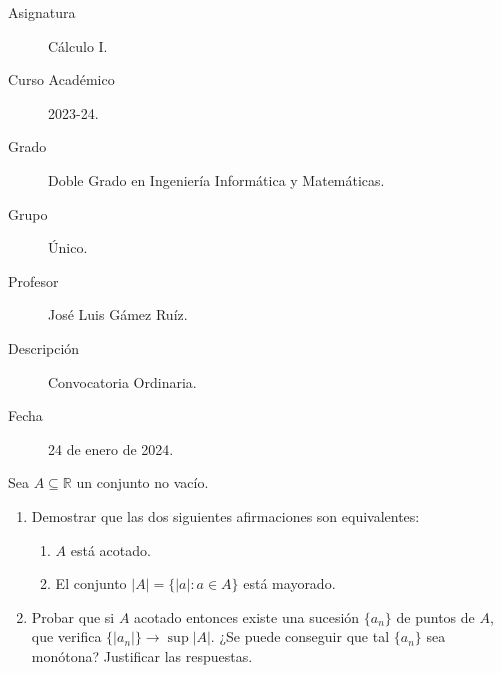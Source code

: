 \documentclass[12pt]{article}
\begin{document}

    
    

    \begin{description}
        \item[Asignatura] Cálculo I.
        \item[Curso Académico] 2023-24.
        \item[Grado] Doble Grado en Ingeniería Informática y Matemáticas.
        \item[Grupo] Único.
        \item[Profesor] José Luis Gámez Ruíz.
        \item[Descripción] Convocatoria Ordinaria.
        \item[Fecha] 24 de enero de 2024.
    
    \end{description}
    \newpage
    \begin{ejercicio}[2 puntos]
        Sea $A \subseteq \mathbb{R}$ un conjunto no vacío.
        \begin{enumerate}
            \item Demostrar que las dos siguientes afirmaciones son equivalentes:
            \begin{enumerate}
                \item $A$ está acotado.
                \item El conjunto $|A| = \{|a| : a \in A\}$ está mayorado.
            \end{enumerate}
            \item Probar que si $A$ acotado entonces existe una sucesión
            $\{a_n\}$ de puntos de $A$, que verifica
            $\{|a_n|\} \to \sup |A|$. ¿Se puede conseguir que tal $\{a_n\}$ sea monótona? Justificar las respuestas.
        \end{enumerate}
    \end{ejercicio}
        
\end{document}
